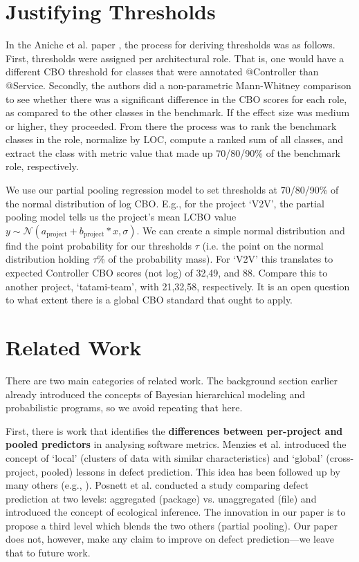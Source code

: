 \documentclass[sigconf,natbib=false]{acmart}
\begin{document}
\section{Justifying Thresholds}
In the Aniche et al. paper \cite{Aniche2016}, the process for deriving thresholds was as follows. First, thresholds were assigned per architectural role. That is, one would have a different CBO threshold for classes that were annotated \textsf{@Controller} than \textsf{@Service}. Secondly, the authors did a non-parametric Mann-Whitney comparison to see whether there was a significant difference in the CBO scores for each role, as compared to the other classes in the benchmark. If the effect size was medium or higher, they proceeded. From there the process was to rank the benchmark classes in the role, normalize by LOC, compute a ranked sum of all classes, and extract the class with metric value that made up 70/80/90\% of the benchmark role, respectively. 

We use our partial pooling regression model to set thresholds at 70/80/90\% of the normal distribution of log CBO. E.g., for the project `V2V', the partial pooling model tells us the project's mean LCBO value $y \sim \mathcal{N}(a_\text{project} + b_\text{project}*x, \sigma)$. We can create a simple normal distribution and find the point probability for our thresholds $\tau$ (i.e. the point on the normal distribution holding $\tau$\% of the probability mass). For `V2V' this translates to expected Controller CBO scores (not log) of 32,49, and 88. Compare this to another project, `tatami-team', with 21,32,58, respectively.  It is an open question to what extent there is a global CBO standard that ought to apply. %

\section{Related Work}
\label{related}
There are two main categories of related work. The background section earlier already introduced the concepts of Bayesian hierarchical modeling and probabilistic programs, so we avoid repeating that here. 

First, there is work that identifies the \textbf{differences between per-project and pooled predictors} in analysing software metrics. Menzies et al. \cite{menzies11ase} introduced the concept of `local' (clusters of data with similar characteristics) and `global' (cross-project, pooled) lessons in defect prediction. This idea has been followed up by many others (e.g., \cite{Kamei2016,Bettenburg2012,panichella14}). Posnett et al. \cite{Posnett:2011} conducted a study comparing defect prediction at two levels: aggregated (package) vs. unaggregated (file) and introduced the concept of ecological inference. The innovation in our paper is to propose a third level which blends the two others (partial pooling). Our paper does not, however, make any claim to improve on defect prediction---we leave that to future work. 
\end{document}
